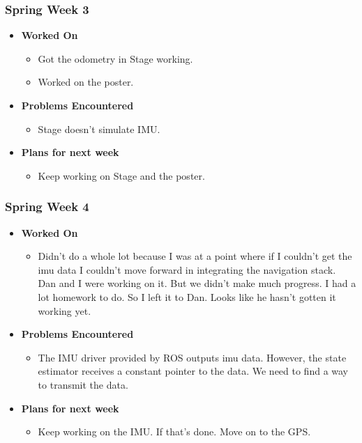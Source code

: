 \documentclass[compsoc,draftclsnofoot,onecolumn,10pt]{IEEEtran}
\begin{document}
\subsubsection{Spring Week 3}
\begin{itemize}
    \item {\textbf{Worked On}}
    \begin{itemize}
      \item Got the odometry in Stage working.
      \item Worked on the poster.
    \end{itemize}

    \item {\textbf{Problems Encountered}}
    \begin{itemize}
      \item Stage doesn't simulate IMU.
    \end{itemize}

    \item{\textbf{Plans for next week}}
    \begin{itemize}
      \item Keep working on Stage and the poster.
    \end{itemize}

\end{itemize}

\subsubsection{Spring Week 4}
\begin{itemize}
    \item {\textbf{Worked On}}
    \begin{itemize}
      \item Didn't do a whole lot because I was at a point where if I couldn't
      get the imu data I couldn't move forward in integrating the navigation
      stack. Dan and I were working on it. But we didn't make much progress.
      I had a lot homework to do. So I left it to Dan. Looks like he hasn't
      gotten it working yet.
    \end{itemize}

    \item {\textbf{Problems Encountered}}
    \begin{itemize}
      \item The IMU driver provided by ROS outputs imu data. However, the state
      estimator receives a constant pointer to the data. We need to find a way to
      transmit the data.
    \end{itemize}

    \item{\textbf{Plans for next week}}
    \begin{itemize}
      \item Keep working on the IMU. If that's done. Move on to the GPS.
    \end{itemize}

\end{itemize}
\end{document}
